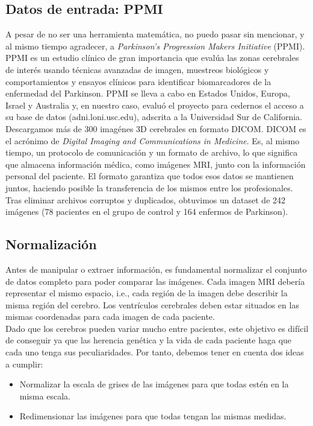 \subsection{Datos de entrada: PPMI}

A pesar de no ser una herramienta matemática, no puedo pasar sin mencionar, y al mismo tiempo agradecer, a \textit{Parkinson's Progression Makers Initiative} (PPMI). PPMI es un estudio clínico de gran importancia que evalúa las zonas cerebrales de interés usando técnicas avanzadas de imagen, muestreos biológicos y comportamientos y ensayos clínicos para identificar biomarcadores de la enfermedad del Parkinson. PPMI se lleva a cabo en Estados Unidos, Europa, Israel y Australia y, en nuestro caso, evaluó el proyecto para cedernos el acceso a su base de datos (adni.loni.usc.edu), adscrita a la Universidad Sur de California. \\

Descargamos más de 300 imagénes 3D cerebrales en formato DICOM. DICOM es el acrónimo de \textit{Digital Imaging and Communications in Medicine}. Es, al mismo tiempo, un protocolo de comunicación y un formato de archivo, lo que significa que almacena información médica, como imágenes MRI, junto con la información personal del paciente. El formato garantiza que todos esos datos se mantienen juntos, haciendo posible la transferencia de los mismos entre los profesionales. Tras eliminar archivos corruptos y duplicados, obtuvimos un dataset de 242 imágenes (78 pacientes en el grupo de control y 164 enfermos de Parkinson). 


\subsection{Normalización}

Antes de manipular o extraer información, es fundamental normalizar el conjunto de datos completo para poder comparar las imágenes. Cada imagen MRI debería representar el mismo espacio, i.e., cada región de la imagen debe describir la misma región del cerebro. Los ventrículos cerebrales deben estar situados en las mismas coordenadas para cada imagen de cada paciente. \\

Dado que los cerebros pueden variar mucho entre pacientes, este objetivo es difícil de conseguir ya que las herencia genética y la vida de cada paciente haga que cada uno tenga sus peculiaridades. Por tanto, debemos tener en cuenta dos ideas a cumplir:

\begin{itemize}
	\item Normalizar la escala de grises de las imágenes para que todas estén en la misma escala.
	\item Redimensionar las imágenes para que todas tengan las mismas medidas.
\end{itemize}

